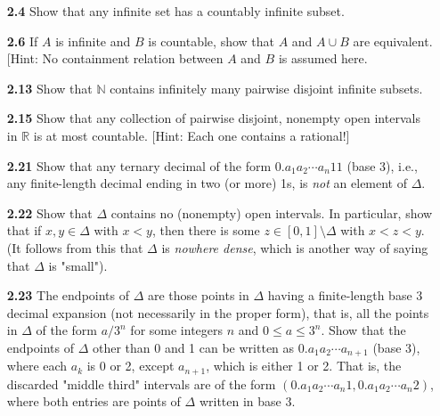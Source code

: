 \documentclass[12pt]{amsart}
\def\RR{{\mathbb R}}
\def\NN{{\mathbb N}}
\begin{document}
\begin{enumerate}

\item[\bf 2.4] Show that any infinite set has a countably infinite subset.

\bigskip

\item[\bf 2.6] If $A$ is infinite and $B$ is countable, show that $A$ and $A\cup B$ are equivalent. [Hint: No containment relation between $A$ and $B$ is assumed here.

\bigskip

\item[\bf 2.13] Show that $\NN$ contains infinitely many pairwise disjoint infinite subsets. 

\bigskip

\item[\bf 2.15] Show that any collection of pairwise disjoint, nonempty open intervals in $\RR$ is at most countable. [Hint: Each one contains a rational!]

\bigskip

\item[\bf 2.21] Show that any ternary decimal of the form $0.a_1a_2\cdots a_n11$ (base 3), i.e., any finite-length decimal ending in two (or more) 1s, is \textit{not} an element of $\Delta$.

\bigskip

\item[\bf 2.22] Show that $\Delta$ contains no (nonempty) open intervals. In particular, show that if $x, y\in\Delta$ with $x<y$, then there is some $z\in [0,1]\setminus\Delta$ with $x<z<y$. (It follows from this that $\Delta$ is \textit{nowhere dense}, which is another way of saying that $\Delta$ is "small").

\bigskip

\item[\bf 2.23] The endpoints of $\Delta$ are those points in $\Delta$ having a finite-length base 3 decimal expansion (not necessarily in the proper form), that is, all the points in $\Delta$ of the form $a/3^n$ for some integers $n$ and $0\leq a\leq 3^n$. Show that the endpoints of $\Delta$ other than 0 and 1 can be written as $0.a_1a_2\cdots a_{n+1}$ (base 3), where each $a_k$ is 0 or 2, except $a_{n+1}$, which is either 1 or 2. That is, the discarded "middle third" intervals are of the form $(0.a_1a_2\cdots a_n 1, 0.a_1a_2\cdots a_n 2)$, where both entries are points of $\Delta$ written in base $3$.

\bigskip


\end{enumerate}
\end{document}

